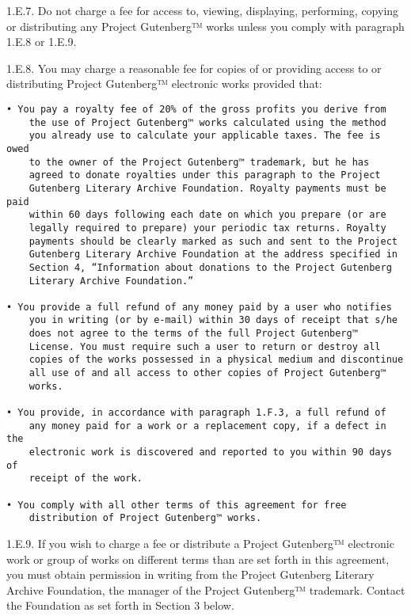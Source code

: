 1.E.7. Do not charge a fee for access to, viewing, displaying,
performing, copying or distributing any Project Gutenberg™ works unless
you comply with paragraph 1.E.8 or 1.E.9.

1.E.8. You may charge a reasonable fee for copies of or providing access
to or distributing Project Gutenberg™ electronic works provided that:

\begin{verbatim}
• You pay a royalty fee of 20% of the gross profits you derive from
    the use of Project Gutenberg™ works calculated using the method
    you already use to calculate your applicable taxes. The fee is owed
    to the owner of the Project Gutenberg™ trademark, but he has
    agreed to donate royalties under this paragraph to the Project
    Gutenberg Literary Archive Foundation. Royalty payments must be paid
    within 60 days following each date on which you prepare (or are
    legally required to prepare) your periodic tax returns. Royalty
    payments should be clearly marked as such and sent to the Project
    Gutenberg Literary Archive Foundation at the address specified in
    Section 4, “Information about donations to the Project Gutenberg
    Literary Archive Foundation.”

• You provide a full refund of any money paid by a user who notifies
    you in writing (or by e-mail) within 30 days of receipt that s/he
    does not agree to the terms of the full Project Gutenberg™
    License. You must require such a user to return or destroy all
    copies of the works possessed in a physical medium and discontinue
    all use of and all access to other copies of Project Gutenberg™
    works.

• You provide, in accordance with paragraph 1.F.3, a full refund of
    any money paid for a work or a replacement copy, if a defect in the
    electronic work is discovered and reported to you within 90 days of
    receipt of the work.

• You comply with all other terms of this agreement for free
    distribution of Project Gutenberg™ works.
\end{verbatim}

1.E.9. If you wish to charge a fee or distribute a Project Gutenberg™
electronic work or group of works on different terms than are set forth
in this agreement, you must obtain permission in writing from the
Project Gutenberg Literary Archive Foundation, the manager of the
Project Gutenberg™ trademark. Contact the Foundation as set forth in
Section 3 below.

